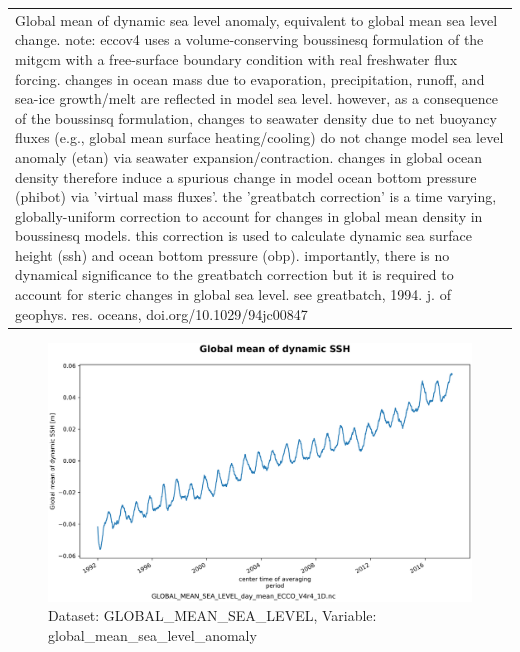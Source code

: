 \begin{longtable}{|m{}|m{}|m{}|m{}|}
\rowcolor{lightgray} \multicolumn{4}{|c|}{\textbf{Comments}} \\ \hline
\multicolumn{4}{|p{1\textwidth}|}{\footnotesize{{Global mean of dynamic sea level anomaly, equivalent to global mean sea level change. note: eccov4 uses a volume-conserving boussinesq formulation of the mitgcm with a free-surface boundary condition with real freshwater flux forcing. changes in ocean mass due to evaporation, precipitation, runoff, and sea-ice growth/melt are reflected in model sea level. however, as a consequence of the boussinsq formulation, changes to seawater density due to net buoyancy fluxes (e.g., global mean surface heating/cooling) do not change model sea level anomaly (etan) via seawater expansion/contraction. changes in global ocean density therefore induce a spurious change in model ocean bottom pressure (phibot) via 'virtual mass fluxes'. the 'greatbatch correction' is a time varying, globally-uniform correction to account for changes in global mean density in boussinesq models. this correction is used to calculate dynamic sea surface height (ssh) and ocean bottom pressure (obp). importantly, there is no dynamical significance to the greatbatch correction but it is required to account for steric changes in global sea level. see greatbatch, 1994. j. of geophys. res. oceans, doi.org/10.1029/94jc00847}}} \\ \hline
\end{longtable}

\begin{figure}[H]
\centering
\includegraphics[scale=0.55]{../images/plots/oneD_plots/Global_Mean_Sea_Level/global_mean_sea_level_anomaly.png}
\caption{Dataset: GLOBAL\_MEAN\_SEA\_LEVEL, Variable: global\_mean\_sea\_level\_anomaly}
\label{tab:table-GLOBAL_MEAN_SEA_LEVEL_global_mean_sea_level_anomaly-Plot}
\end{figure}
\newpage
\pagebreak
